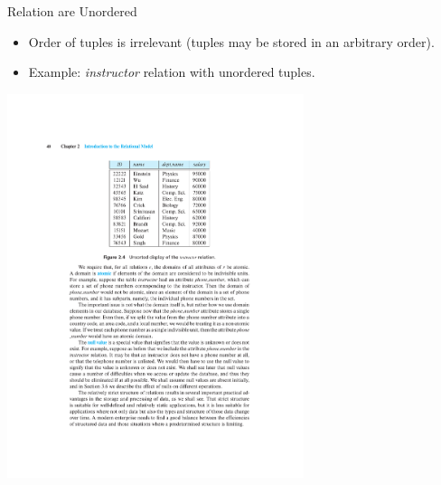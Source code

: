\documentclass{beamer}
\begin{document}
\begin{frame}{Relation are Unordered}
    \begin{itemize}
        \item Order of tuples is irrelevant (tuples may be stored in an arbitrary order).
        \item Example: \textit{instructor} relation with unordered tuples.
    \end{itemize}
    \centering
    \vspace{5mm}
    \includegraphics[width=0.65\textwidth, trim={7.25cm 16.75cm 6.5cm 4.75cm}, clip]{figures/Instructor_unordered}
\end{frame}
\end{document}
